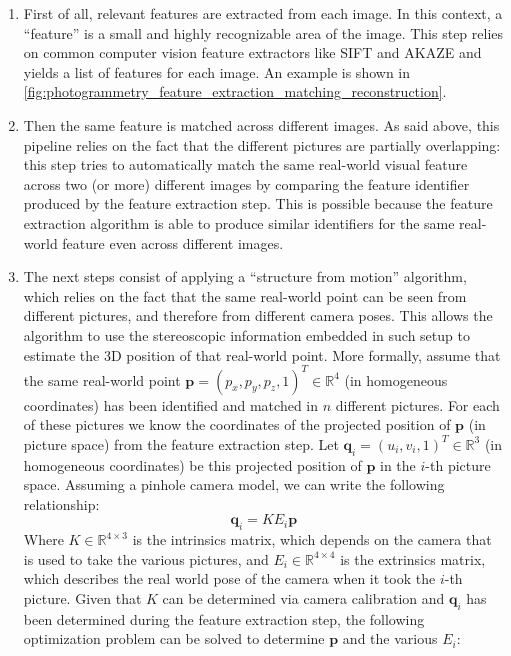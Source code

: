\begin{enumerate}
    \item First of all, relevant features are extracted from each image. In this context, a \enquote{feature} is a small and highly recognizable area of the image. This step relies on common computer vision feature extractors like SIFT\cite{lowe_distinctive_2004} and AKAZE\cite{alcantarilla_fast_2013} and yields a list of features for each image. An example is shown in \autoref{fig:photogrammetry_feature_extraction_matching_reconstruction}.
    \item Then the same feature is matched across different images. As said above, this pipeline relies on the fact that the different pictures are partially overlapping: this step tries to automatically match the same real-world visual feature across two (or more) different images by comparing the feature identifier produced by the feature extraction step. This is possible because the feature extraction algorithm is able to produce similar identifiers for the same real-world feature even across different images.
    \item The next steps consist of applying a \enquote{structure from motion} algorithm, which relies on the fact that the same real-world point can be seen from different pictures, and therefore from different camera poses. This allows the algorithm to use the stereoscopic information embedded in such setup to estimate the 3D position of that real-world point. More formally, assume that the same real-world point $\mathbf{p} = \left(p_x, p_y, p_z, 1\right)^T \in \mathbb{R}^4$ (in homogeneous coordinates) has been identified and matched in $n$ different pictures. For each of these pictures we know the coordinates of the projected position of $\mathbf{p}$ (in picture space) from the feature extraction step. Let $\mathbf{q}_i = \left(u_i, v_i, 1\right)^T \in \mathbb{R}^3$ (in homogeneous coordinates) be this projected position of $\mathbf{p}$ in the $i$-th picture space. Assuming a pinhole camera model\cite{hata_cs231a_nodate}, we can write the following relationship:
    \begin{equation}
        \mathbf{q}_i = K E_i \mathbf{p}
    \end{equation}
    Where $K \in \mathbb{R}^{4\times3}$ is the intrinsics matrix, which depends on the camera that is used to take the various pictures, and $E_i \in \mathbb{R}^{4\times4}$ is the extrinsics matrix, which describes the real world pose of the camera when it took the $i$-th picture. Given that $K$ can be determined via camera calibration\cite{zhang_flexible_2000} and $\mathbf{q}_i$ has been determined during the feature extraction step, the following optimization problem can be solved to determine $\mathbf{p}$ and the various $E_i$:

\end{enumerate}

